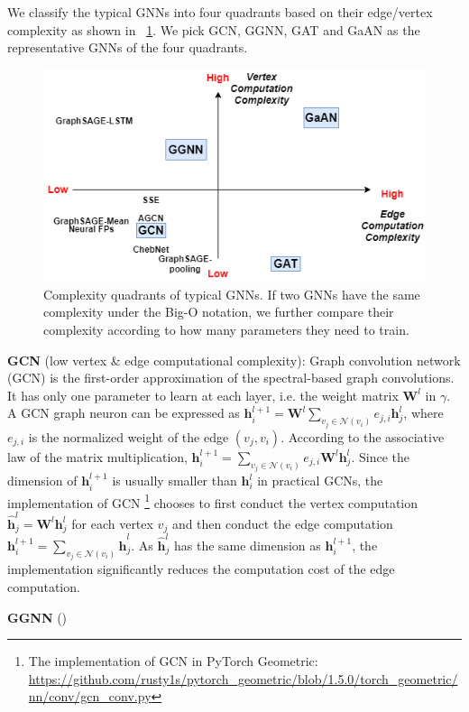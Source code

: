 We classify the typical GNNs into four quadrants based on their edge/vertex complexity as shown in \figurename~\ref{fig:gnn_complexity_quadrant}. We pick GCN, GGNN, GAT and GaAN as the representative GNNs of the four quadrants.

\begin{figure}
	\centering
	\includegraphics[width=0.7\columnwidth]{figs/illustration/GNN_complexity_quadrant.png}
	\caption{Complexity quadrants of typical GNNs. If two GNNs have the same complexity under the Big-O notation, we further compare their complexity according to how many parameters they need to train.}
	\label{fig:gnn_complexity_quadrant}
\end{figure}

\textbf{GCN} \cite{kipf2017_gcn} (low vertex \& edge computational complexity): Graph convolution network (GCN) is the first-order approximation of the spectral-based graph convolutions.
It has only one parameter to learn at each layer, i.e. the weight matrix $\boldsymbol{W}^l$ in $\gamma$.
A GCN graph neuron can be expressed as $\boldsymbol{h}^{l+1}_i = \boldsymbol{W}^l\sum_{v_j \in \mathcal{N}(v_i)}{e_{j,i}\boldsymbol{h}^l_j}$, where $e_{j,i}$ is the normalized weight of the edge $(v_j, v_i)$.
According to the associative law of the matrix multiplication, $\boldsymbol{h}^{l+1}_i = \sum_{v_j \in \mathcal{N}(v_i)}{e_{j,i}\boldsymbol{W}^l\boldsymbol{h}^l_j}$.
Since the dimension of $\boldsymbol{h}^{l+1}_i$ is usually smaller than $\boldsymbol{h}^l_i$ in practical GCNs, the implementation of GCN \footnote{The implementation of GCN in PyTorch Geometric: \url{ https://github.com/rusty1s/pytorch_geometric/blob/1.5.0/torch_geometric/nn/conv/gcn_conv.py}} chooses to first conduct the vertex computation $\hat{\boldsymbol{h}}^l_j = \boldsymbol{W}^l\boldsymbol{h}^l_j$ for each vertex $v_j$ and then conduct the edge computation $\boldsymbol{h}^{l+1}_i=\sum_{v_j\in\mathcal{N}(v_i)}{\hat{\boldsymbol{h}}^l_j}$.
As $\hat{\boldsymbol{h}}^l_j$ has the same dimension as $\boldsymbol{h}^{l+1}_i$, the implementation significantly reduces the  computation cost of the edge computation.

\textbf{GGNN} ()